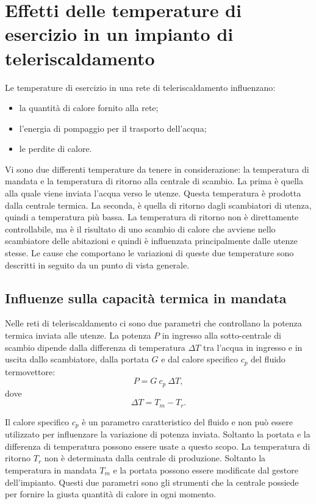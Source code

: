 \documentclass[laurea,oneside,11pt]{USiena_tesiLM3}
\begin{document}
\section{Effetti delle temperature di esercizio in un impianto di teleriscaldamento}
Le temperature di esercizio in una rete di teleriscaldamento  influenzano:
\begin{itemize}
\item la quantità di calore fornito alla rete;
\item l'energia di pompaggio per il trasporto dell'acqua;
\item le perdite di calore.
\end{itemize}

Vi sono due differenti temperature da tenere in considerazione: la temperatura di mandata e la temperatura di ritorno alla centrale di scambio. La prima è quella alla quale viene inviata l'acqua verso le utenze. Questa temperatura è prodotta dalla centrale termica. La seconda, è quella di ritorno dagli scambiatori di utenza, quindi a temperatura più bassa. La temperatura di ritorno non è direttamente controllabile, ma è il risultato di uno scambio di calore che avviene nello scambiatore delle abitazioni e quindi è influenzata principalmente dalle utenze stesse.
Le cause che comportano le variazioni di queste due temperature sono descritti in seguito da un punto di vista generale. 

\subsection{Influenze sulla capacità termica in mandata}
Nelle reti di teleriscaldamento ci sono due parametri che controllano la potenza termica inviata alle utenze. La potenza $P$ in ingresso alla sotto-centrale di scambio dipende dalla differenza di temperatura  $\Delta T$ tra l'acqua in ingresso e  in uscita dallo scambiatore, dalla portata $G$ e dal calore specifico $c_p$ del fluido termovettore:
\begin{equation}
P = G \ c_p \ \Delta T ,
\label{eq:Potenza}
\end{equation} 
dove
\begin{equation}
\Delta T = T_{m} - T_{r} .
\label{eq:dT}
\end{equation}

Il calore specifico $c_p$ è un parametro caratteristico del fluido e non può essere utilizzato per influenzare la variazione di potenza inviata. Soltanto la portata e la differenza di temperatura   possono essere usate a questo scopo. La temperatura di ritorno $T_{r}$ non è determinata dalla centrale di produzione. Soltanto la temperatura in mandata $T_{m}$ e la portata possono essere modificate dal gestore dell'impianto.
Questi due parametri sono gli strumenti che la centrale possiede per fornire la giusta quantità di calore in ogni momento.
\end{document}
